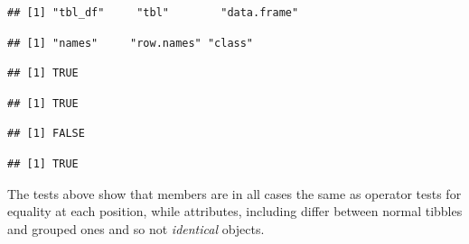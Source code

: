 \documentclass[krantz2]{krantz}\usepackage{knitr}%
\begin{document}
\begin{warningbox}
\begin{knitrout}\footnotesize
{}\color{fgcolor}\begin{kframe}
\begin{alltt}
 \hlkwb{<-} 
\end{alltt}
\begin{verbatim}
## [1] "tbl_df"     "tbl"        "data.frame"
\end{verbatim}
\begin{alltt}
\hlstd{(}
\end{alltt}
\begin{verbatim}
## [1] "names"     "row.names" "class"
\end{verbatim}
\end{kframe}
\end{knitrout}

\begin{knitrout}\footnotesize
{}\color{fgcolor}\begin{kframe}
\begin{alltt}
 \hlopt{==} 
\end{alltt}
\begin{verbatim}
## [1] TRUE
\end{verbatim}
\begin{alltt}
 \hlopt{==} 
\end{alltt}
\begin{verbatim}
## [1] TRUE
\end{verbatim}
\begin{alltt}
\end{alltt}
\begin{verbatim}
## [1] FALSE
\end{verbatim}
\begin{alltt}
\end{alltt}
\begin{verbatim}
## [1] TRUE
\end{verbatim}
\end{kframe}
\end{knitrout}

The tests above show that members are in all cases the same as operator \Roperator{==} tests for equality at each position, while attributes, including  differ between normal tibbles and grouped ones and so not \emph{identical} objects.


\end{warningbox}
\end{document}
